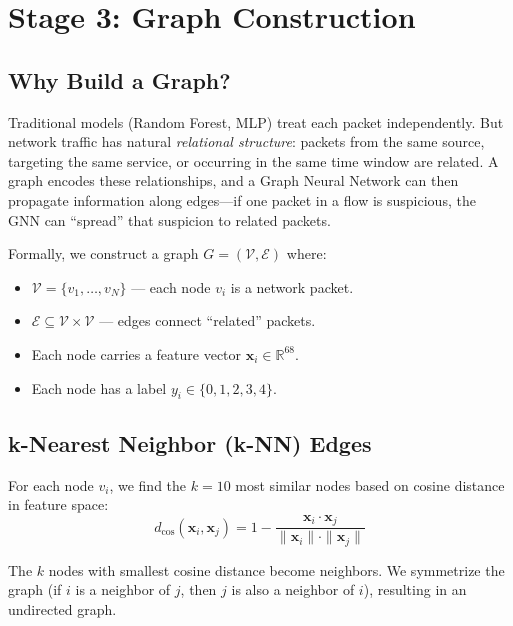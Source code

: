 \documentclass[conference]{IEEEtran}
\newcommand{\R}{\mathbb{R}}
\newcommand{\E}{\mathcal{E}}
\newcommand{\V}{\mathcal{V}}
\newcommand{\vect}[1]{\bm{#1}}
\begin{document}
\section{Stage 3: Graph Construction}
\label{sec:graph}

\subsection{Why Build a Graph?}

Traditional models (Random Forest, MLP) treat each packet independently. But network traffic has natural \emph{relational structure}: packets from the same source, targeting the same service, or occurring in the same time window are related. A graph encodes these relationships, and a Graph Neural Network can then propagate information along edges---if one packet in a flow is suspicious, the GNN can ``spread'' that suspicion to related packets.

Formally, we construct a graph $G = (\V, \E)$ where:
\begin{itemize}
    \item $\V = \{v_1, \ldots, v_N\}$ --- each node $v_i$ is a network packet.
    \item $\E \subseteq \V \times \V$ --- edges connect ``related'' packets.
    \item Each node carries a feature vector $\vect{x}_i \in \R^{68}$.
    \item Each node has a label $y_i \in \{0, 1, 2, 3, 4\}$.
\end{itemize}

\subsection{k-Nearest Neighbor (k-NN) Edges}

For each node $v_i$, we find the $k = 10$ most similar nodes based on cosine distance in feature space:
\begin{equation}
    d_{\cos}(\vect{x}_i, \vect{x}_j) = 1 - \frac{\vect{x}_i \cdot \vect{x}_j}{\|\vect{x}_i\| \cdot \|\vect{x}_j\|}
\end{equation}

The $k$ nodes with smallest cosine distance become neighbors. We symmetrize the graph (if $i$ is a neighbor of $j$, then $j$ is also a neighbor of $i$), resulting in an undirected graph.
\end{document}
